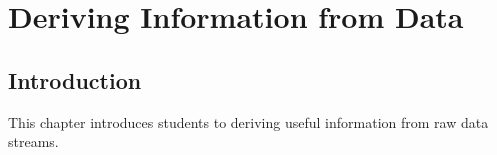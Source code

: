 \chapter{Deriving Information from Data}

\section{Introduction}
This chapter introduces students to deriving useful information from raw data streams.
